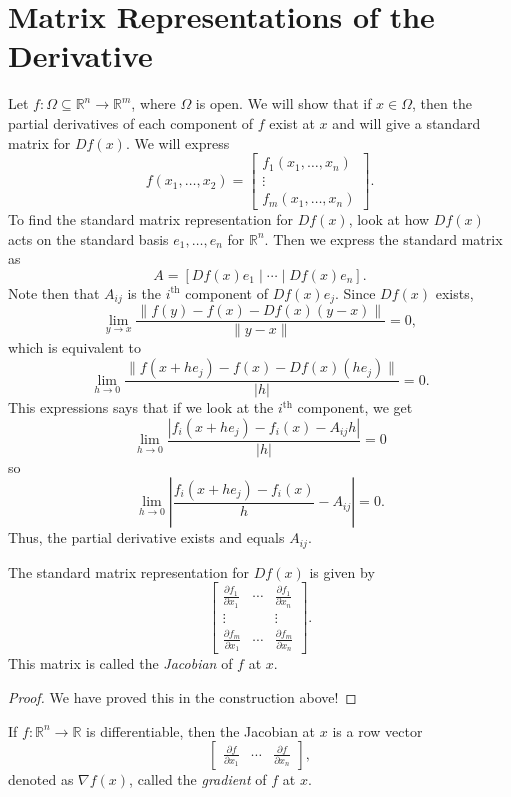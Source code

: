 \documentclass[11pt]{article}
\theoremstyle{definition}
\newcommand{\R}{\mathbb{R}}                      %
\begin{document}
\section{Matrix Representations of the Derivative}
Let $f:\Omega\subseteq \R^n\to\R^m$, where $\Omega$ is open. We will show that if $x\in\Omega$, then the partial derivatives of each component of  $f$ exist at $x$ and will give a standard matrix for $Df(x)$.  We will express 
$$
f(x_1,\dots,x_2)=\begin{bmatrix}
f_1(x_1,\dots,x_n)\\
\vdots\\
f_m(x_1,\dots,x_n)
\end{bmatrix}.
$$
To find the standard matrix representation for $Df(x)$, look at how $Df(x)$ acts on the standard basis $e_1,\dots,e_n$ for $\R^n$. Then we express the standard matrix as
$$
A=[Df(x)e_1\;|\;\cdots\;|\;Df(x)e_n].
$$
Note then that $A_{ij}$ is the $i^\mathrm{th}$ component of $Df(x)e_j$. Since $Df(x)$ exists,
$$
\lim_{y\to x}\frac{\|f(y)-f(x)-Df(x)(y-x)\|}{\|y-x\|}=0,
$$
which is equivalent to 
$$
\lim_{h\to 0}\frac{\|f(x+he_j)-f(x)-Df(x)(he_j)\|}{|h|}=0.
$$
This expressions says that if we look at the $i^\mathrm{th}$ component, we get 
$$
\lim_{h\to 0}\frac{|f_i(x+he_j)-f_i(x)-A_{ij}h|}{|h|}=0
$$
so
$$
\lim_{h\to 0}\left|\frac{f_i(x+he_j)-f_i(x)}{h}-A_{ij}\right|=0.
$$
Thus, the partial derivative exists and equals $A_{ij}$.

\prop The standard matrix representation for $Df(x)$ is given by
$$
\begin{bmatrix}
    \frac{\partial f_1}{\partial x_1} &\cdots & \frac{\partial f_1}{\partial x_n}\\
    \vdots & & \vdots \\
    \frac{\partial f_m}{\partial x_1} &\cdots & \frac{\partial f_m}{\partial x_n}
\end{bmatrix}.
$$
This matrix is called the \textit{Jacobian} of $f$ at $x$.

\begin{proof}
    We have proved this in the construction above!
\end{proof}

\ex If $f:\R^n\to \R$ is differentiable, then the Jacobian at $x$ is a row vector
$$
\begin{bmatrix}
\frac{\partial f}{\partial x_1}& \cdots & \frac{\partial f}{\partial x_n}
\end{bmatrix},
$$
denoted as $\nabla f(x)$, called the \textit{gradient} of $f$ at $x$.
\end{document}
